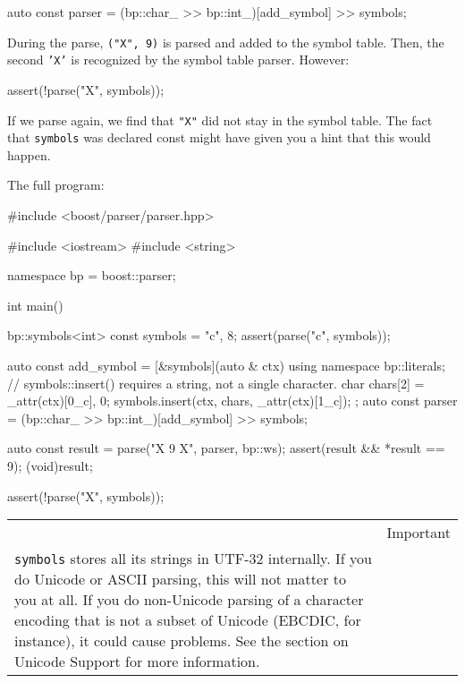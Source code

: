 \begin{code}
auto const parser = (bp::char_ >> bp::int_)[add_symbol] >> symbols;
\end{code}

During the parse, \texttt{("X", 9)} is parsed and added to the symbol table. Then, the second \texttt{'X'} is recognized by the symbol table parser. However:

\begin{code}
assert(!parse("X", symbols));
\end{code}

If we parse again, we find that \texttt{"X"} did not stay in the symbol table. The fact that \texttt{symbols} was declared const might have given you a hint that this would happen.

The full program:

\begin{code}
#include <boost/parser/parser.hpp>

#include <iostream>
#include <string>


namespace bp = boost::parser;

int main()
{
    bp::symbols<int> const symbols = {{"c", 8}};
    assert(parse("c", symbols));

    auto const add_symbol = [&symbols](auto & ctx) {
        using namespace bp::literals;
        // symbols::insert() requires a string, not a single character.
        char chars[2] = {_attr(ctx)[0_c], 0};
        symbols.insert(ctx, chars, _attr(ctx)[1_c]);
    };
    auto const parser = (bp::char_ >> bp::int_)[add_symbol] >> symbols;

    auto const result = parse("X 9 X", parser, bp::ws);
    assert(result && *result == 9);
    (void)result;

    assert(!parse("X", symbols));
}
\end{code}

\begin{longtable}[]{@{}
  >{\raggedright\arraybackslash}p{}
  >{\raggedright\arraybackslash}p{}@{}}
\toprule\noalign{}
\endhead
\bottomrule\noalign{}
\endlastfoot
\begin{minipage}[t]{\linewidth}\raggedright
\end{minipage} & Important \\
\texttt{symbols} stores all its strings in UTF-32 internally. If you do Unicode or ASCII parsing, this will not matter to you at all. If you do non-Unicode parsing of a character encoding that is not a subset of Unicode (EBCDIC, for instance), it could cause problems. See the section on Unicode Support for more information. & \\
\end{longtable}

